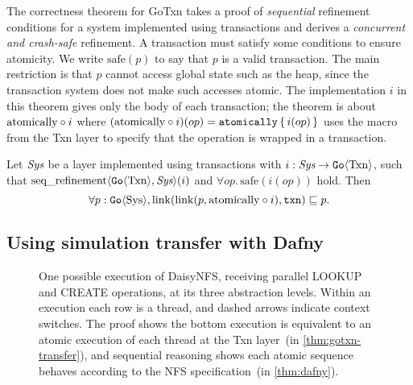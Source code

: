 The correctness theorem for GoTxn takes a proof of \emph{sequential} refinement
conditions for a system implemented using transactions and derives a \emph{concurrent and crash-safe} refinement.
A transaction must satisfy some conditions to ensure atomicity. We write
$\mathrm{safe}(p)$ to say that $p$ is a valid transaction. The main
restriction is that $p$ cannot access global state such as the heap, since
the transaction system does not make such accesses atomic.
The implementation $i$
in this theorem gives only the body of each transaction; the theorem is about
$\mathrm{atomically}\circ i$ where $(\mathrm{atomically}\circ i)(op) = \mathtt{atomically}\,\{\, i(op) \,\}$ uses
the macro from the Txn layer to specify that the
operation is wrapped in a transaction.
\begin{theorem}
  Let $\textit{Sys}$ be a layer implemented using transactions with
$i : \textit{Sys} \to \mathtt{Go}\langle \mathrm{Txn} \rangle$, such that
$\operatorname{seq\_refinement}\langle \mathtt{Go}\langle \mathrm{Txn} \rangle, \textit{Sys} \rangle(i)$ and
$\forall op.\, \mathrm{safe}(i(op))$ hold. Then
\[
  \forall p : \mathtt{Go}\langle \mathrm{Sys} \rangle, \mathrm{link}(\mathrm{link}(p, \mathrm{atomically}\circ i), \texttt{txn}) \sqsubseteq p.
\]
\label{thm:gotxn-transfer}
\end{theorem}

\subsection{Using simulation transfer with Dafny}

\begin{figure}
  \begin{center}
  
  \end{center}
  \vspace{-\baselineskip}
  \caption{One possible execution of DaisyNFS, receiving parallel LOOKUP and
    CREATE operations, at its three abstraction levels.
    Within an execution each row is a thread, and dashed arrows indicate
    context switches.
    The proof shows the bottom execution is equivalent to an atomic execution of
    each thread at
    the Txn layer~(in \cref{thm:gotxn-transfer}),
    and sequential reasoning shows each atomic sequence behaves according to the NFS
    specification~(in \cref{thm:dafny}).}
  \label{fig:refinement-execs}
\end{figure}

